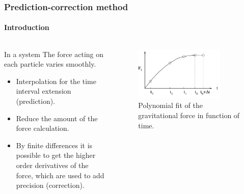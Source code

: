 \begin{frame}
    \frametitle{Prediction-correction method}
    \framesubtitle{Introduction}
    \begin{columns}
        \begin{column}{0.6\textwidth}
            \begin{block}{In a {\nbody} system}
                The force acting on each particle varies smoothly.
            \end{block}

            \begin{itemize}
                \item Interpolation for the time interval extension (prediction).
                \item Reduce the amount of the force calculation.
                \item By finite differences it is possible to get the higher order
                derivatives of the force, which are used to add precision (correction).
            \end{itemize}
        \end{column}
        \begin{column}{0.4\textwidth}
            \begin{figure}
                \centering
                \includegraphics[width=0.8\textwidth]{img/polinomio}
                \caption{Polynomial fit of the gravitational force in function of time.}
                \label{fig:polinomio}
            \end{figure}

        \end{column}
    \end{columns}
\end{frame}

